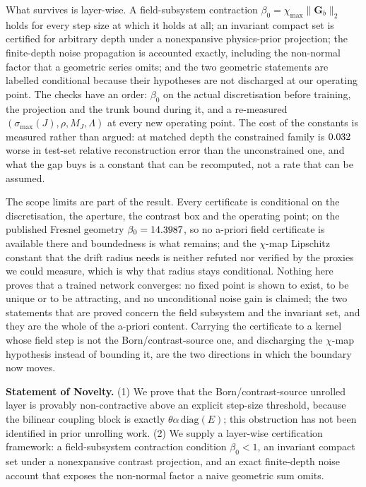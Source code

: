 \documentclass[journal,cmes,article,submit,moreauthors,pdftex]{Definitions/tsp}
\newcommand{\norm}[1]{\lVert #1 \rVert}
\newcommand{\numv}[1]{#1}
\begin{document}
What survives is layer-wise. A field-subsystem contraction
$\beta_0=\chi_{\max}\norm{\mathbf{G}_b}_2$ holds for every step size at which it holds at all; an
invariant compact set is certified for arbitrary depth under a nonexpansive physics-prior projection;
the finite-depth noise propagation is accounted exactly, including the non-normal factor that a
geometric series omits; and the two geometric statements are labelled conditional because their
hypotheses are not discharged at our operating point. The checks have an order: $\beta_0$ on the
actual discretisation before training, the projection and the trunk bound during it, and a
re-measured $(\sigma_{\max}(J),\rho,M_J,\Lambda)$ at every new operating point. The cost of the
constants is measured rather than argued: at matched depth the constrained family is
$\numv{\NumPriceDelta}$ worse in test-set relative reconstruction error than the unconstrained one,
and what the gap buys is a constant that can be recomputed, not a rate that can be assumed.

The scope limits are part of the result. Every certificate is conditional on the discretisation,
the aperture, the contrast box and the operating point; on the published Fresnel geometry
$\beta_0=\numv{\NumFresnelBeta}$, so no a-priori field certificate is available there and
boundedness is what remains; and the $\chi$-map Lipschitz constant that the drift radius needs is
neither refuted nor verified by the proxies we could measure, which is why that radius stays
conditional. Nothing here proves that a trained network converges: no fixed point is shown to
exist, to be unique or to be attracting, and no unconditional noise gain is claimed; the two
statements that are proved concern the field subsystem and the invariant set, and they are the
whole of the a-priori content. Carrying the certificate to a kernel whose field step is not the Born/contrast-source
one, and discharging the $\chi$-map hypothesis instead of bounding it, are the two directions in
which the boundary now moves.

\noindent\textbf{Statement of Novelty.}
(1) We prove that the Born/contrast-source unrolled layer is provably non-contractive above an
explicit step-size threshold, because the bilinear coupling block is exactly
$\theta\alpha\,\mathrm{diag}(E)$; this obstruction has not been identified in prior unrolling
work. (2) We supply a layer-wise certification framework: a field-subsystem contraction condition
$\beta_0<1$, an invariant compact set under a nonexpansive contrast projection, and an exact
finite-depth noise account that exposes the non-normal factor a naive geometric sum omits.
\end{document}
